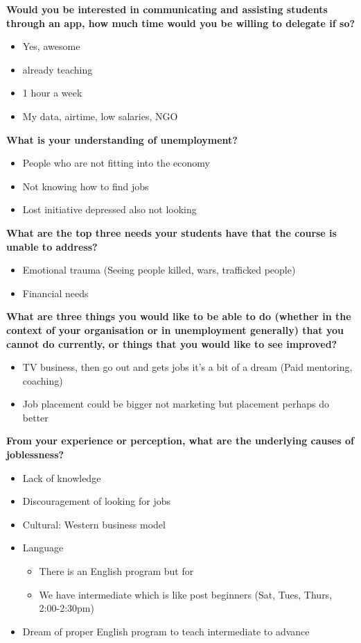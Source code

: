 \noindent\textbf{Would you be interested in communicating and assisting students through an app, how much time would you be willing to delegate if so?}
\begin{itemize}
\item Yes, awesome
\item already teaching
\item 1 hour a week
\item My data, airtime, low salaries, NGO
\end{itemize}

\noindent\textbf{What is your understanding of unemployment?}
\begin{itemize}
\item People who are not fitting into the economy
\item Not knowing how to find jobs
\item Lost initiative depressed also not looking
\end{itemize}

\noindent\textbf{What are the top three needs your students have that the course is unable to address?}
\begin{itemize}
\item Emotional trauma (Seeing people killed, wars, trafficked people)
\item Financial needs
\end{itemize}

\noindent\textbf{What are three things you would like to be able to do (whether in the context of your organisation or in unemployment generally) that you cannot do currently, or things that you would like to see improved?}
\begin{itemize}
\item TV business, then go out and gets jobs it’s a bit of a dream (Paid mentoring, coaching)
\item Job placement could be bigger not marketing but placement perhaps do better
\end{itemize}

\noindent\textbf{From your experience or perception, what are the underlying causes of joblessness?}
\begin{itemize}
\item Lack of knowledge
\item Discouragement of looking for jobs
\item Cultural: Western business model
\item Language
\begin{itemize}
\item There is an English program but for
\item We have intermediate which is like post beginners (Sat, Tues, Thurs, 2:00-2:30pm)\end{itemize}
\item Dream of proper English program to teach intermediate to advance
\end{itemize}



